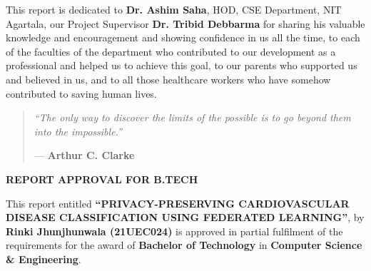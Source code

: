 \documentclass{nitathesis}
\begin{document}
\setcounter{page}{3}

\begin{dedication}
    This report is dedicated to \textbf{Dr. Ashim Saha}, HOD, CSE Department, NIT Agartala, our Project Supervisor \textbf{Dr. Tribid Debbarma} for sharing his valuable knowledge and encouragement and showing confidence in us all the time, to each of the faculties of the department who contributed to our development as a professional and helped us to achieve this goal, to our parents who supported us and believed in us, and to all those healthcare workers who have somehow contributed to saving human lives.
\end{dedication}

\begin{thesisquote}
    \vspace*{1.5in}
    \begin{quote}
        \centering
        \Large \itshape
        ``The only way to discover the limits of the possible is to go beyond them into the impossible.''
        
        \vspace{0.5cm}
        \normalfont \large --- \textbf{Arthur C. Clarke}
    \end{quote}
\end{thesisquote}

\cleardoublepage
\thispagestyle{plain}
\begin{center}
    \vspace*{0.3in}
    {\Large \textbf{REPORT APPROVAL FOR B.TECH}\par}
    \vspace{0.8in}
\end{center}

\noindent This report entitled \textbf{``PRIVACY-PRESERVING CARDIO\-VASCULAR DISEASE CLASSIFICATION USING FEDERATED LEARNING''}, by \textbf{Rinki Jhunjhunwala (21UEC024)} is approved in partial fulfilment of the requirements for the award of \textbf{Bachelor of Technology} in \textbf{Computer Science \& Engineering}.
\end{document}
